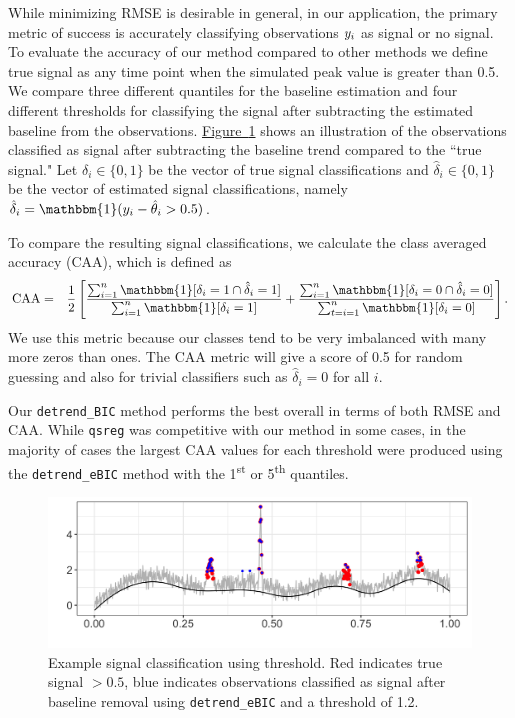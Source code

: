 \documentclass[12pt]{article}
\newcommand{\Fig}[1]{\hyperref[fig:#1]{Figure~\ref*{fig:#1}}} %
\newcommand{\Fig}[1]{{Figure~\ref{fig:#1}}} %
\newcommand{\One}{\mathbbm{1}}
\newcommand{\VE}[2]{\MakeLowercase{#1}_{#2}} %
\begin{document}
	While minimizing RMSE is desirable in general, in our application, the primary metric of success is accurately classifying observations $\VE{y}{i}$ as signal or no signal. To evaluate the accuracy of our method compared to other methods we define true signal as any time point when the simulated peak value is greater than 0.5. We compare three different quantiles for the baseline estimation and four different thresholds for classifying the signal after subtracting the estimated baseline from the observations.  \Fig{peaks_class_eg} shows an illustration of the observations classified as signal after subtracting the baseline trend compared to the ``true signal." Let $\delta_i \in \{0,1\}$ be the vector of true signal classifications and $\hat{\delta}_i \in \{0,1\}$ be the vector of estimated signal classifications, namely $\hat{\delta}_i = \One(\VE{y}{i} - \hat{\theta}_{i} > 0.5)$.
	
	
	To compare the resulting signal classifications, we calculate the class averaged accuracy (CAA), which is defined as
	\begin{eqnarray*}
	\mbox{CAA} & = & \frac{1}{2}\left[\frac{\sum_{i=1}^n \One[\delta_i = 1 \cap \hat{\delta}_i = 1]}{\sum_{i=1}^n \One[\delta_i = 1]} + \frac{\sum_{i=1}^n \One[\delta_i = 0 \cap \hat{\delta}_i=0]}{\sum_{t=i=1}^n \One[\delta_i = 0]}\right].
	\end{eqnarray*}  
	We use this metric because our classes tend to be very imbalanced with many more zeros than ones. The CAA metric will give a score of 0.5 for random guessing and also for trivial classifiers such as $\hat{\delta}_i = 0$ for all $i$. 

	Our \texttt{detrend\_BIC} method performs the best overall in terms of both RMSE and CAA. While \texttt{qsreg} was competitive with our method in some cases, in the majority of cases the largest CAA values for each threshold were produced using the \texttt{detrend\_eBIC} method with the 1\textsuperscript{st} or 5\textsuperscript{th} quantiles. 
	
	\begin{figure}[h!]
		\includegraphics[width = \linewidth]{Figures/peaks_eg_class.png}
		\caption{Example signal classification using threshold. Red indicates true signal $>0.5$, blue indicates observations classified as signal after baseline removal using \texttt{detrend\_eBIC} and a threshold of 1.2.}
		\label{fig:peaks_class_eg}
	\end{figure}
	
\end{document}
